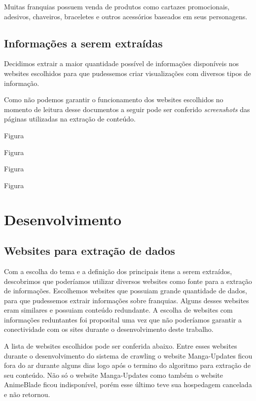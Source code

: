 \documentclass[12pt]{article}
\begin{document}
Muitas franquias possuem venda de produtos como cartazes promocionais, adesivos, chaveiros, braceletes e outros acessórios baseados em seus personagens.


\subsection{Informações a serem extraídas}

Decidimos extrair a maior quantidade possível de informações disponíveis nos websites escolhidos para que pudessemos criar visualizações com diversos tipos de informação.

Como não podemos garantir o funcionamento dos websites escolhidos no momento de leitura desse documentos a seguir pode ser conferido \textit{screenshots} das páginas utilizadas na extração de conteúdo.

Figura


Figura


Figura


Figura


\section{Desenvolvimento}

\subsection{Websites para extração de dados}

Com a escolha do tema e a definição dos principais itens a serem extraídos, descobrimos que poderíamos utilizar diversos websites como fonte para a extração de informações. 
Escolhemos websites que possuiam grande quantidade de dados, para que pudessemos extrair informações sobre franquias. Alguns desses websites eram similares e possuiam conteúdo redundante. A escolha de websites com informações reduntantes foi proposital uma vez que não poderíamos garantir a conectividade com os sites durante o desenvolvimento deste trabalho.

A lista de websites escolhidos pode ser conferida abaixo. Entre esses websites durante o desenvolvimento do sistema de crawling o website Manga-Updates ficou fora do ar durante alguns dias logo após o termino do algoritmo para extração de seu conteúdo. Não só o website Manga-Updates como também o website AnimeBlade ficou indisponível, porém esse último teve sua hospedagem cancelada e não retornou.
\end{document}
